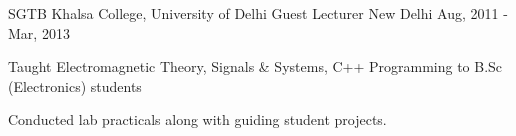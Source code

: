 

\begin{cventries}


  \cventry
    {SGTB Khalsa College, University of Delhi} %
    {Guest Lecturer} %
    {New Delhi} %
    {Aug, 2011 - Mar, 2013} %
    {
      \begin{cvitems} %
        \item {Taught Electromagnetic Theory, Signals \& Systems, C++ Programming to B.Sc (Electronics) students}
        \item {Conducted lab practicals along with guiding student projects.}
      \end{cvitems}
    }


\end{cventries}
